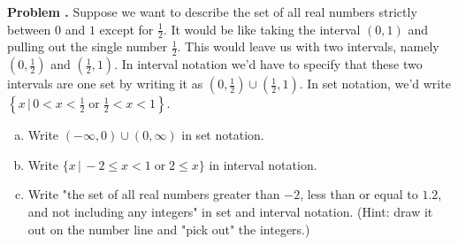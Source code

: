 \documentclass[11pt,letterpaper]{article}
\newcounter{problem}
\newcommand{\problem}{
	\stepcounter{problem}%
	\noindent \textbf{Problem \theproblem. }%
}
\begin{document}
\vspace{.5cm}



\problem Suppose we want to describe the set of all real numbers strictly between $0$ and $1$ except for $\frac{1}{2}$. It would be like taking the interval $(0,1)$ and pulling out the single number $\frac{1}{2}$. This would leave us with two intervals, namely $\left(0, \frac{1}{2}\right)$ and $\left(\frac{1}{2}, 1\right)$. In interval notation we'd have to specify that these two intervals are one set by writing it as  $\left(0, \frac{1}{2}\right) \cup \left(\frac{1}{2}, 1\right)$. In set notation, we'd write $\left\{ x \, | \, 0 < x < \frac{1}{2} \; \text{or} \; \frac{1}{2} < x < 1 \right\}$. \\
\begin{enumerate}[(a)]
	\item Write $(-\infty, 0) \cup (0, \infty)$ in set notation.
	\item Write $ \{ x \, | \,  -2 \le x < 1 \; \text{or} \; 2 \le x \}$ in interval notation.
	\item Write "the set of all real numbers greater than $-2$, less than or equal to $1.2$, and not including any integers" in set and interval notation. (Hint: draw it out on the number line and "pick out" the integers.) 
\end{enumerate} 

\vspace{.5cm}
\end{document}
